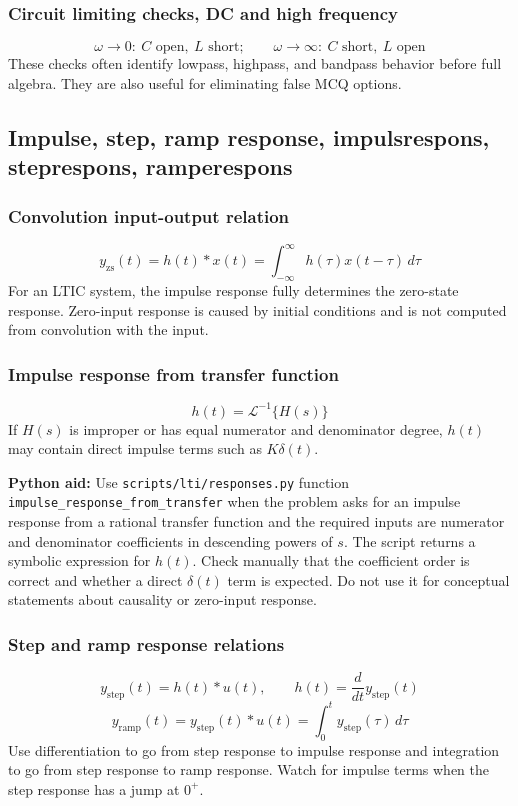 \subsubsection{Circuit limiting checks, DC and high frequency}
\[
\omega\to0:\ C\text{ open},\ L\text{ short};\qquad
\omega\to\infty:\ C\text{ short},\ L\text{ open}
\]
These checks often identify lowpass, highpass, and bandpass behavior before full algebra. They are also useful for eliminating false MCQ options.

\subsection{Impulse, step, ramp response, impulsrespons, steprespons, ramperespons}

\subsubsection{Convolution input-output relation}
\[
y_{\mathrm{zs}}(t)=h(t)*x(t)=\int_{-\infty}^{\infty}h(\tau)x(t-\tau)\,d\tau
\]
For an LTIC system, the impulse response fully determines the zero-state response. Zero-input response is caused by initial conditions and is not computed from convolution with the input.

\subsubsection{Impulse response from transfer function}
\[
h(t)=\mathcal{L}^{-1}\{H(s)\}
\]
If \(H(s)\) is improper or has equal numerator and denominator degree, \(h(t)\) may contain direct impulse terms such as \(K\delta(t)\).

\textbf{Python aid:} Use \texttt{scripts/lti/responses.py} function \texttt{impulse\_response\_from\_transfer} when the problem asks for an impulse response from a rational transfer function and the required inputs are numerator and denominator coefficients in descending powers of \(s\). The script returns a symbolic expression for \(h(t)\). Check manually that the coefficient order is correct and whether a direct \(\delta(t)\) term is expected. Do not use it for conceptual statements about causality or zero-input response.

\subsubsection{Step and ramp response relations}
\[
y_{\mathrm{step}}(t)=h(t)*u(t),\qquad
h(t)=\frac{d}{dt}y_{\mathrm{step}}(t)
\]
\[
y_{\mathrm{ramp}}(t)=y_{\mathrm{step}}(t)*u(t)=\int_0^t y_{\mathrm{step}}(\tau)\,d\tau
\]
Use differentiation to go from step response to impulse response and integration to go from step response to ramp response. Watch for impulse terms when the step response has a jump at \(0^+\).

